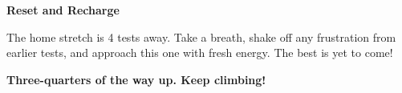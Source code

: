 {\begin{tcolorbox}[
    enhanced,
    colback=funYellowLight,
    colframe=funYellow!60,
    arc=10pt,
    boxrule=1pt,
    left=6mm, right=6mm, top=4mm, bottom=4mm,
]
{\bfseries\color{funYellowDark} \faLightbulb\hspace{2mm}Reset and Recharge}

\vspace{2mm}

The home stretch is 4 tests away. Take a breath, shake off any frustration from earlier tests, and approach this one with fresh energy. The best is yet to come!
\end{tcolorbox}

\vspace{4mm}

\begin{center}
{\large\bfseries\color{funBlueDark} \faMountain\hspace{2mm}Three-quarters of the way up. Keep climbing!\hspace{2mm}\faMountain}
\end{center}

}
\newpage
